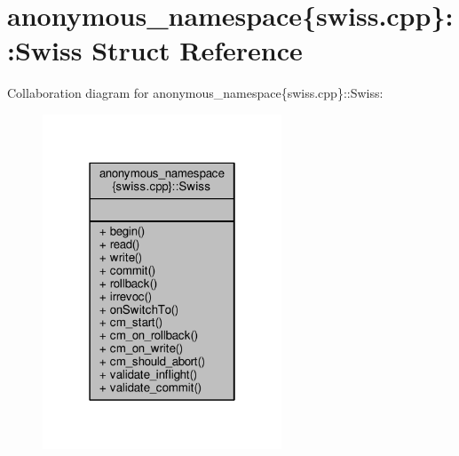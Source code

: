 \hypertarget{structanonymous__namespace_02swiss_8cpp_03_1_1Swiss}{\section{anonymous\-\_\-namespace\{swiss.\-cpp\}\-:\-:Swiss Struct Reference}
\label{structanonymous__namespace_02swiss_8cpp_03_1_1Swiss}
}


Collaboration diagram for anonymous\-\_\-namespace\{swiss.\-cpp\}\-:\-:Swiss\-:
\nopagebreak
\begin{figure}[H]
\begin{center}
\leavevmode
\includegraphics[width=202pt]{structanonymous__namespace_02swiss_8cpp_03_1_1Swiss__coll__graph}
\end{center}
\end{figure}
